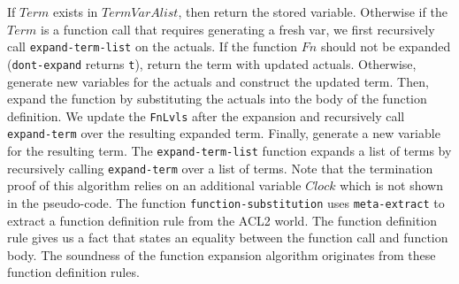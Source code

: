 If $Term$ exists in $TermVarAlist$, then return the stored variable. Otherwise
if the $Term$ is a function call that requires generating a fresh var, we first
recursively call \texttt{expand-term-list} on the actuals. If the function $Fn$
should not be expanded (\texttt{dont-expand} returns \texttt{t}), return the
term with updated actuals. Otherwise, generate new variables for the actuals and
construct the updated term. Then, expand the function by substituting the
actuals into the body of the function definition. We update the \texttt{FnLvls}
after the expansion and recursively call \texttt{expand-term} over the resulting
expanded term. Finally, generate a new variable for the resulting term.
The \texttt{expand-term-list} function expands a list of terms by recursively
calling \texttt{expand-term} over a list of terms. Note that the termination
proof of  this algorithm relies on an additional variable $Clock$ which is not
shown in the pseudo-code. The function \texttt{function-substitution} uses
\texttt{meta-extract} to extract a function definition rule from the ACL2 world.
The function definition rule gives us a fact that states an equality between the
function call and function body. The soundness of the function expansion
algorithm originates from these function definition rules.

